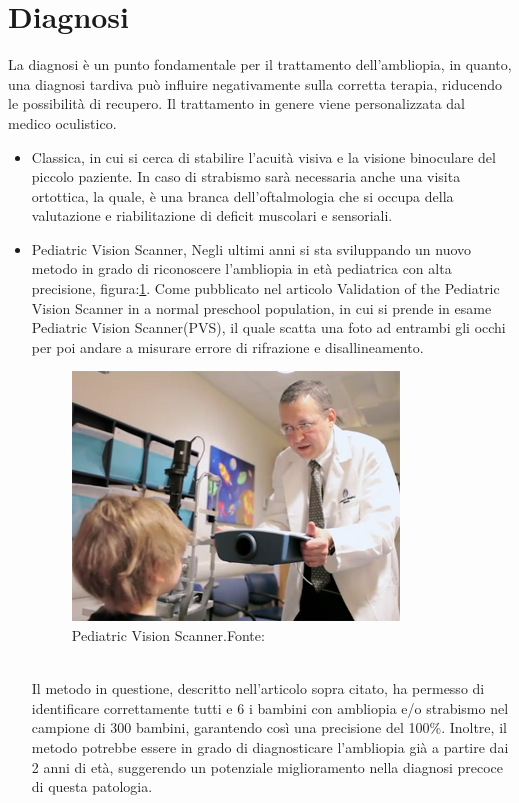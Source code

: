 \documentclass[
a4paper,
cleardoublepage=empty,
headings=twolinechapter,
numbers=autoenddot,
]{scrbook}
\begin{document}
	\section{Diagnosi}
	La diagnosi è un punto fondamentale per il trattamento dell'ambliopia, in quanto, una diagnosi tardiva può influire negativamente sulla corretta terapia, riducendo le possibilità di recupero.
	Il trattamento in genere viene personalizzata dal medico oculistico.
	\begin{itemize}
		\item Classica, in cui si cerca di stabilire l'acuità visiva e la visione binoculare del piccolo paziente. In caso di strabismo sarà necessaria anche una visita ortottica, la quale, è una branca dell'oftalmologia che si occupa della valutazione e riabilitazione di deficit muscolari e sensoriali.
		\item Pediatric Vision Scanner, Negli ultimi anni si sta sviluppando un nuovo metodo in grado di riconoscere l'ambliopia in età pediatrica con alta precisione, figura:\ref{fig:pvs}.
		Come pubblicato nel articolo Validation of the Pediatric Vision Scanner in a normal preschool population\cite{pvs}, in cui si prende in esame Pediatric Vision Scanner(PVS), il quale scatta una foto ad entrambi gli occhi per poi andare a misurare errore di rifrazione e disallineamento.
			\begin{figure}[h]
				\centering
				\includegraphics[width=0.7\linewidth]{image/pvs}
				\caption{Pediatric Vision Scanner.Fonte:\cite{PVS_image}}
				\label{fig:pvs}
	    	\end{figure}\\
        Il metodo in questione, descritto nell'articolo sopra citato, ha permesso di identificare correttamente tutti e 6 i bambini con ambliopia e/o strabismo nel campione di 300 bambini, garantendo così una precisione del 100\%. Inoltre, il metodo potrebbe essere in grado di diagnosticare l'ambliopia già a partire dai 2 anni di età, suggerendo un potenziale miglioramento nella diagnosi precoce di questa patologia.
	
	\end{itemize}
   
\end{document}
